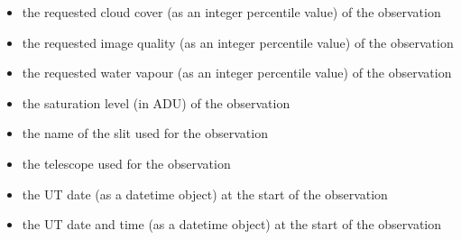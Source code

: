 \documentclass[letterpaper,10pt,english]{sphinxmanual}
\begin{document}
\begin{itemize}
\item {} 
the requested cloud cover (as an integer percentile value) of the observation

\end{itemize}

\begin{itemize}
\item {} 
the requested image quality (as an integer percentile value) of the
observation

\end{itemize}

\begin{itemize}
\item {} 
the requested water vapour (as an integer percentile value) of the
observation

\end{itemize}

\begin{itemize}
\item {} 
the saturation level (in ADU) of the observation

\end{itemize}

\begin{itemize}
\item {} 
the name of the slit used for the observation

\end{itemize}

\begin{itemize}
\item {} 
the telescope used for the observation

\end{itemize}

\begin{itemize}
\item {} 
the UT date (as a datetime object) at the start of the observation

\end{itemize}

\begin{itemize}
\item {} 
the UT date and time (as a datetime object) at the start of the observation

\end{itemize}
\end{document}
